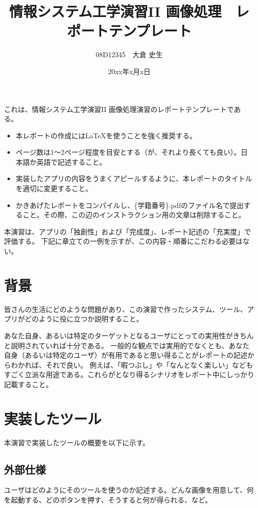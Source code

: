 \documentclass[twocolumn, a4paper]{jsarticle}
\begin{document}
\title{情報システム工学演習II 画像処理　レポートテンプレート}
\author{08D12345　大倉 史生}
\date{20xx年x月x日} 
\twocolumn[
\maketitle
]

これは、情報システム工学演習II 画像処理演習のレポートテンプレートである。
\begin{itemize}
\item 本レポートの作成には\LaTeX を使うことを強く推奨する。
\item ページ数は1～2ページ程度を目安とする（が、それより長くても良い）。日本語か英語で記述すること。
\item 実装したアプリの内容をうまくアピールするように、本レポートのタイトルを適切に変更すること。
\item かきあげたレポートをコンパイルし、\{学籍番号\}.pdfのファイル名で提出すること。その際、この辺のインストラクション用の文章は削除すること。
\end{itemize}
本演習は、アプリの「独創性」および「完成度」、レポート記述の「充実度」で評価する。
下記に章立ての一例を示すが、この内容・順番にこだわる必要はない。

\section{背景}
皆さんの生活にどのような問題があり、この演習で作ったシステム、ツール、アプリがどのように役に立つか説明すること。

あなた自身、あるいは特定のターゲットとなるユーザにとっての実用性がきちんと説明されていれば十分である。
一般的な観点では実用的でなくとも、あなた自身（あるいは特定のユーザ）が有用であると思い得ることがレポートの記述からわかれば、それで良い。
例えば、「暇つぶし」や「なんとなく楽しい」などもすごく立派な用途である。これらがとなり得るシナリオをレポート中にしっかり記載すること。

\section{実装したツール}
本演習で実装したツールの概要を以下に示す。

\subsection{外部仕様}
ユーザはどのようにそのツールを使うのか記述する。どんな画像を用意して、何を起動する、どのボタンを押す、そうすると何が得られる、など。
\end{document}
